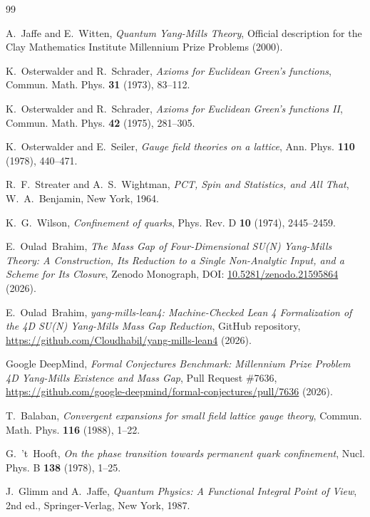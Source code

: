 \documentclass[11pt,reqno]{amsart}
\theoremstyle{plain}
\theoremstyle{definition}
\theoremstyle{remark}
\numberwithin{equation}{section}
\begin{document}
\begin{thebibliography}{99}

A.~Jaffe and E.~Witten, \emph{Quantum Yang-Mills Theory}, Official description for the Clay Mathematics Institute Millennium Prize Problems (2000).

K.~Osterwalder and R.~Schrader, \emph{Axioms for Euclidean Green's functions}, Commun. Math. Phys. \textbf{31} (1973), 83--112.

K.~Osterwalder and R.~Schrader, \emph{Axioms for Euclidean Green's functions II}, Commun. Math. Phys. \textbf{42} (1975), 281--305.

K.~Osterwalder and E.~Seiler, \emph{Gauge field theories on a lattice}, Ann. Phys. \textbf{110} (1978), 440--471.

R.~F.~Streater and A.~S.~Wightman, \emph{PCT, Spin and Statistics, and All That}, W.~A.~Benjamin, New York, 1964.

K.~G.~Wilson, \emph{Confinement of quarks}, Phys. Rev. D \textbf{10} (1974), 2445--2459.

E.~Oulad~Brahim, \emph{The Mass Gap of Four-Dimensional SU(N) Yang-Mills Theory: A Construction, Its Reduction to a Single Non-Analytic Input, and a Scheme for Its Closure}, Zenodo Monograph, DOI: \href{https://doi.org/10.5281/zenodo.21595864}{10.5281/zenodo.21595864} (2026).

E.~Oulad~Brahim, \emph{yang-mills-lean4: Machine-Checked Lean 4 Formalization of the 4D SU(N) Yang-Mills Mass Gap Reduction}, GitHub repository, \url{https://github.com/Cloudhabil/yang-mills-lean4} (2026).

Google DeepMind, \emph{Formal Conjectures Benchmark: Millennium Prize Problem 4D Yang-Mills Existence and Mass Gap}, Pull Request \#7636, \url{https://github.com/google-deepmind/formal-conjectures/pull/7636} (2026).

T.~Balaban, \emph{Convergent expansions for small field lattice gauge theory}, Commun. Math. Phys. \textbf{116} (1988), 1--22.

G.~'t~Hooft, \emph{On the phase transition towards permanent quark confinement}, Nucl. Phys. B \textbf{138} (1978), 1--25.

J.~Glimm and A.~Jaffe, \emph{Quantum Physics: A Functional Integral Point of View}, 2nd ed., Springer-Verlag, New York, 1987.

\end{thebibliography}
\end{document}
